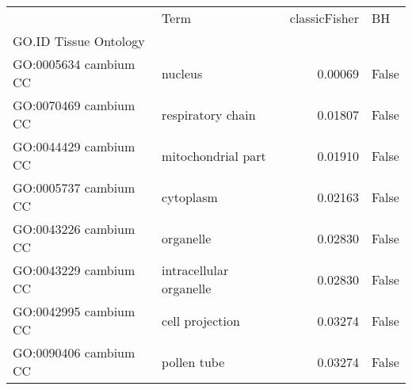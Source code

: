 \begin{tabular}{llrl}
\toprule
{} &                     Term &  classicFisher &     BH \\
GO.ID      Tissue  Ontology &                          &                &        \\
GO:0005634 cambium CC       &                  nucleus &        0.00069 &  False \\
\midrule
GO:0070469 cambium CC       &        respiratory chain &        0.01807 &  False \\
GO:0044429 cambium CC       &       mitochondrial part &        0.01910 &  False \\
GO:0005737 cambium CC       &                cytoplasm &        0.02163 &  False \\
GO:0043226 cambium CC       &                organelle &        0.02830 &  False \\
GO:0043229 cambium CC       &  intracellular organelle &        0.02830 &  False \\
GO:0042995 cambium CC       &          cell projection &        0.03274 &  False \\
GO:0090406 cambium CC       &              pollen tube &        0.03274 &  False \\
\bottomrule
\end{tabular}
